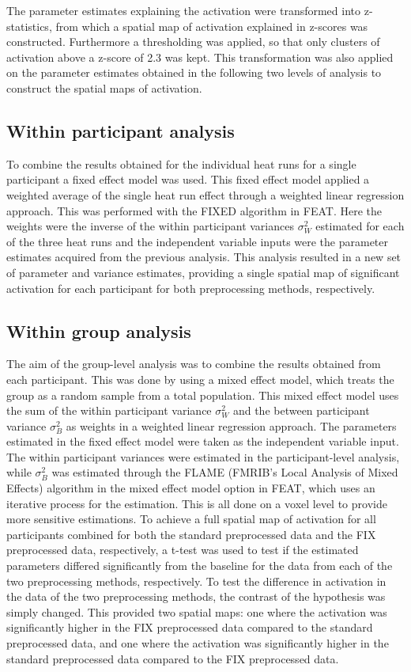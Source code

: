 The parameter estimates explaining the activation were transformed into z-statistics, from which a spatial map of activation explained in z-scores was constructed. Furthermore a thresholding was applied, so that only clusters of activation above a z-score of 2.3 was kept. This transformation was also applied on the parameter estimates obtained in the following two levels of analysis to construct the spatial maps of activation. 

\subsection{Within participant analysis}
To combine the results obtained for the individual heat runs for a single participant a fixed effect model was used. This fixed effect model applied a weighted average of the single heat run effect through a weighted linear regression approach. This was performed with the FIXED algorithm in FEAT. Here the weights were the inverse of the within participant variances $\sigma_{W}^{2}$ estimated for each of the three heat runs and the independent variable inputs were the parameter estimates acquired from the previous analysis. This analysis resulted in a new set of parameter and variance estimates, providing a single spatial map of significant activation for each participant for both preprocessing methods, respectively.

\subsection{Within group analysis}
The aim of the group-level analysis was to combine the results obtained from each participant. This was done by using a mixed effect model, which treats the group as a random sample from a total population. This mixed effect model uses the sum of the within participant variance $\sigma_{W}^{2}$ and the between participant variance $\sigma_{B}^{2}$ as weights in a weighted linear regression approach. The parameters estimated in the fixed effect model were taken as the independent variable input. The within participant variances were estimated in the participant-level analysis, while $\sigma_{B}^{2}$ was estimated through the FLAME (FMRIB's Local Analysis of Mixed Effects) algorithm in the mixed effect model option in FEAT, which uses an iterative process for the estimation. This is all done on a voxel level to provide more sensitive estimations.
To achieve a full spatial map of activation for all participants combined for both the standard preprocessed data and the FIX preprocessed data, respectively, a t-test was used to test if the estimated parameters differed significantly from the baseline for the data from each of the two preprocessing methods, respectively. 
To test the difference in activation in the data of the two preprocessing methods, the contrast of the hypothesis was simply changed. This provided two spatial maps: one where the activation was significantly higher in the FIX preprocessed data compared to the standard preprocessed data, and one where the activation was significantly higher in the standard preprocessed data compared to the FIX preprocessed data.

